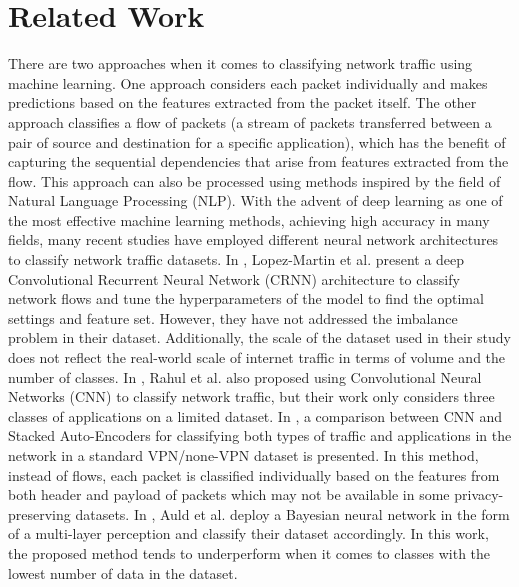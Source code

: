 \section{Related Work}
There are two approaches when it comes to classifying network traffic using machine learning. One approach considers each packet individually and makes predictions based on the features extracted from the packet itself. The other approach classifies a flow of packets (a stream of packets transferred between a pair of source and destination for a specific application), which has the benefit of capturing the sequential dependencies that arise from features extracted from the flow. This approach can also be processed using methods inspired by the field of Natural Language Processing (NLP). With the advent of deep learning as one of the most effective machine learning methods, achieving high accuracy in many fields, many recent studies have employed different neural network architectures to classify network traffic datasets. In \cite{maghalebasecrnn}, Lopez-Martin et al. present a deep Convolutional Recurrent Neural Network (CRNN) architecture to classify network flows and tune the hyperparameters of the model to find the optimal settings and feature set. However, they have not addressed the imbalance problem in their dataset. Additionally, the scale of the dataset used in their study does not reflect the real-world scale of internet traffic in terms of volume and the number of classes. In \cite{springer_deep}, Rahul et al. also proposed using Convolutional Neural Networks (CNN) to classify network traffic, but their work only considers three classes of applications on a limited dataset. In \cite{sharifia}, a comparison between CNN and Stacked Auto-Encoders for classifying both types of traffic and applications in the network in a standard VPN/none-VPN dataset is presented. In this method, instead of flows, each packet is classified individually based on the features from both header and payload of packets which may not be available in some privacy-preserving datasets. In \cite{bayesianneural}, Auld et al. deploy a Bayesian neural network in the form of a multi-layer perception and classify their dataset accordingly. In this work, the proposed method tends to underperform when it comes to classes with the lowest number of data in the dataset. 
